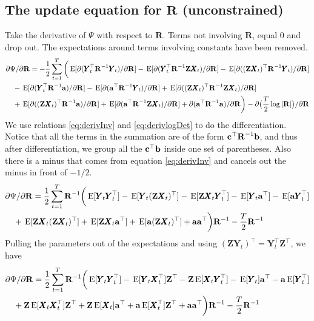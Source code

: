 \documentclass[]{article}
\def\ZZ{\mbox{$\mathbf Z$}}	\def\zz{\mbox{$\mathbf z$}}
\def\RR{\mbox{$\mathbf R$}}	 \def\rr{\mbox{$\mathbf r$}}
\def\XX{\mbox{$\pmb{X}$}}	\def\xx{\mbox{$\pmb{x}$}}
\def\YY{\mbox{$\pmb{Y}$}}	\def\yy{\mbox{$\pmb{y}$}}
\def\E{\,\textup{\textrm{E}}}
\begin{document}
\subsection{The update equation for $\RR$ (unconstrained)}
Take the derivative of $\Psi$ with respect to $\RR$.  Terms not involving $\RR$, equal 0 and drop out.  The expectations around terms involving constants have been removed. 
\begin{equation}\label{eq:R.unconstrained1}
\begin{split}
&\partial\Psi/\partial\RR = -\frac{1}{2} \sum_{t=1}^T\bigg(
\E[\partial(\YY_t^\top\RR^{-1}\YY_t)/\partial\RR]
-\E[\partial(\YY_t^\top\RR^{-1}\ZZ\XX_t)/\partial\RR] -\E[\partial((\ZZ\XX_t)^\top\RR^{-1}\YY_t)/\partial\RR]\\
&\quad   - \E[\partial(\YY_t^\top\RR^{-1}\aa)/\partial\RR] 
 - \E[\partial(\aa^\top\RR^{-1}\YY_t)/\partial\RR] 
+ \E[\partial((\ZZ\XX_t)^\top\RR^{-1}\ZZ\XX_t)/\partial\RR] \\
&\quad + \E[\partial((\ZZ\XX_t)^\top\RR^{-1}\aa)/\partial\RR] 
+ \E[\partial(\aa^\top\RR^{-1}\ZZ\XX_t)/\partial\RR] 
 + \partial(\aa^\top\RR^{-1}\aa)/\partial\RR
\bigg) - \partial\big(\frac{T}{2}\log |\RR| \big)/\partial\RR 
\end{split}
\end{equation}
We use relations \eqref{eq:derivInv} and \eqref{eq:derivlogDet} to do the differentiation. Notice that all the terms in the summation are of the form $\cc^\top\RR^{-1}\bb$, and thus after differentiation, we group all the $\mbox{$\mathbf c$}^\top\mbox{$\mathbf b$}$ inside one set of parentheses. Also there is a minus that comes from equation \ref{eq:derivInv} and cancels out the minus in front of $-1/2$.
\begin{equation}\label{eq:R.unconstrained2}
\begin{split}
&\partial\Psi/\partial\RR = \frac{1}{2} \sum_{t=1}^T \RR^{-1} \bigg(  
 \E[\YY_t\YY_t^\top] -\E[\YY_t(\ZZ\XX_t)^\top] - \E[\ZZ\XX_t\YY_t^\top ] -  \E[\YY_t\aa^\top]  -  \E[\aa\YY_t^\top]\\
&\quad    + \E[ \ZZ\XX_t(\ZZ\XX_t)^\top ] + \E[\ZZ\XX_t\aa^\top] + \E[ \aa(\ZZ\XX_t)^\top ] 
 + \aa\aa^\top \bigg)\RR^{-1} - \frac{T}{2}\RR^{-1} 
\end{split}
\end{equation}
Pulling the parameters out of the expectations and using $(\ZZ\YY_t)^\top = \YY_t^\top\ZZ^\top$, we have
\begin{equation}\label{eq:R.unconstrained3}
\begin{split}
&\partial\Psi/\partial\RR = \frac{1}{2} \sum_{t=1}^T \RR^{-1} \bigg(  
 \E[\YY_t\YY_t^\top] -\E[\YY_t\XX_t^\top ]\ZZ^\top - \ZZ\E[\XX_t\YY_t^\top] 
 -  \E[\YY_t]\aa^\top - \aa\E[\YY_t^\top] \\
&\quad  + \ZZ\E[ \XX_t\XX_t^\top ]\ZZ^\top + \ZZ\E[\XX_t]\aa^\top + \aa\E[\XX_t^\top ]\ZZ^\top 
 + \aa\aa^\top \bigg)\RR^{-1} - \frac{T}{2}\RR^{-1} 
\end{split}
\end{equation}
\end{document}
